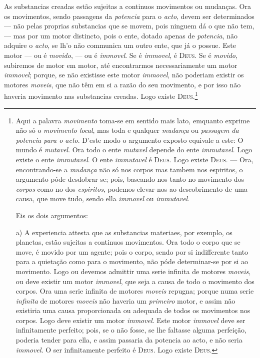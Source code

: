  As substancias creadas estão sujeitas a continuos movimentos ou mudanças. Ora
os movimentos, sendo passagens da \emph{potencia} para o \emph{acto}, devem ser
determinados --- não pelas proprias substancias que se movem, pois ninguem dá o que não
tem, --- mas por um motor distincto, pois o ente, dotado apenas de \emph{potencia}, não
adquire o \emph{acto}, se lh'o não communica um outro ente, que já o possue. Este motor
--- ou é \emph{movido}, --- ou é \emph{immovel}. Se é \emph{immovel}, é \textsc{Deus}.
Se é \emph{movido}, subiremos de motor em motor, até encontrarmos necessariamente um
motor \emph{immovel}; porque, se não existisse este motor \emph{immovel}, não poderiam
existir os motores \emph{moveis}, que não têm em si a razão do seu movimento, e por
isso não haveria movimento nas substancias creadas. Logo existe
\textsc{Deus}.\footnote{Aqui a palavra \emph{movimento} toma-se em sentido mais lato, emquanto exprime não só o
\emph{movimento local}, mas toda e qualquer \emph{mudança} ou \emph{passagem da potencia
para o acto}. D'este modo o argumento exposto equivale a este: O mundo é
\emph{mutavel}. Ora todo o ente \emph{mutavel} depende do ente \emph{immutavel}. Logo
existe o ente \emph{immutavel}. O ente \emph{immutavel} é \textsc{Deus}. Logo existe
\textsc{Deus}. --- Ora, encontrando-se a \emph{mudança} não só nos corpos mas tambem nos
espiritos, o argumento póde desdobrar-se; pois, baseando-nos tanto no movimento dos
\emph{corpos} como no dos \emph{espiritos}, podemos elevar-nos ao descobrimento de uma
causa, que move tudo, sendo ella \emph{immovel} ou \emph{immutavel}.

Eis os dois argumentos:

a) A experiencia attesta que as substancias materiaes, por exemplo, os planetas, estão
sujeitas a continuos movimentos. Ora todo o corpo que se move, é movido por um agente;
pois o corpo, sendo por si indifferente tanto para a quietação como para o movimento,
não póde determinar-se por si ao movimento. Logo ou devemos admittir uma serie infinita
de motores \emph{moveis}, ou deve existir um motor \emph{immovel}, que seja a causa de
todo o movimento dos corpos. Ora uma serie infinita de motores \emph{moveis} repugna;
porque numa serie \emph{infinita} de motores \emph{moveis} não haveria um
\emph{primeiro} motor, e assim não existiria uma causa proporcionada ou adequada de
todos os movimentos
nos corpos. Logo deve existir um motor \emph{immovel}. Este motor \emph{immovel} deve
ser infinitamente perfeito; pois, se o não fosse, se lhe faltasse alguma perfeição,
poderia tender para ella, e assim passaria da potencia ao acto, e não seria
\emph{immovel}. O ser infinitamente perfeito é \textsc{Deus}. Logo existe
\textsc{Deus}.

}
